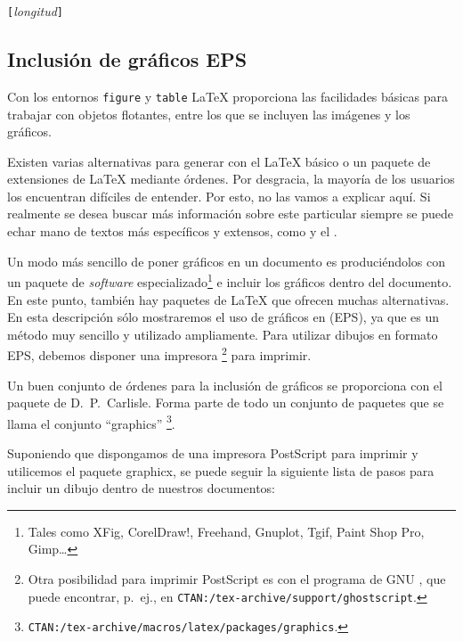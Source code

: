\begin{command}
\ci{\bs}\verb|[|\emph{longitud}\verb|]|
\end{command}

\subsection{Inclusión de gráficos EPS}

Con los entornos \texttt{figure} y \texttt{table} \LaTeX{} proporciona
las facilidades básicas para trabajar con objetos flotantes, entre los
que se incluyen las imágenes y los gráficos.

Existen varias alternativas para generar  con el \LaTeX{}
básico o un  paquete de extensiones de \LaTeX{}  mediante órdenes. Por
desgracia,  la mayoría  de los  usuarios los  encuentran difíciles  de
entender. Por  esto, no  las vamos  a explicar  aquí. Si  realmente se
desea buscar  más información sobre  este particular siempre  se puede
echar mano de  textos más específicos y extensos,  como \companion{} y
el \manual.

Un   modo   más  sencillo   de   poner   gráficos  en   un   documento
es    produciéndolos    con     un    paquete    de    \emph{software}
especializado\footnote{Tales como XFig, CorelDraw!, Freehand, Gnuplot,
Tgif, Paint  Shop Pro, Gimp\ldots}  e incluir los gráficos  dentro del
documento. En este punto, también hay paquetes de \LaTeX{} que ofrecen
muchas alternativas.  En esta descripción  sólo mostraremos el  uso de
gráficos en  (EPS), ya que es un método muy
sencillo  y utilizado  ampliamente. Para  utilizar dibujos  en formato
EPS,  debemos  disponer  una  impresora  \footnote{Otra
posibilidad   para  imprimir   PostScript  es   con  el   programa  de
GNU  \textsc{},   que  puede  encontrar,   p.~ej.,  en
\texttt{CTAN:/tex-archive/support/ghostscript}.} para imprimir.

Un    buen    conjunto   de    órdenes    para    la   inclusión    de
gráficos    se    proporciona    con   el    paquete    
de    D.~P.~Carlisle.    Forma    parte   de    todo    un    conjunto
de    paquetes    que    se   llama    el    conjunto    ``graphics''%
\footnote{\texttt{CTAN:/tex-archive/macros/latex/packages/graphics}.}.

Suponiendo que dispongamos de una impresora PostScript para imprimir y
utilicemos el paquete \textsf{graphicx},  se puede seguir la siguiente
lista de pasos para incluir un dibujo dentro de nuestros documentos:

